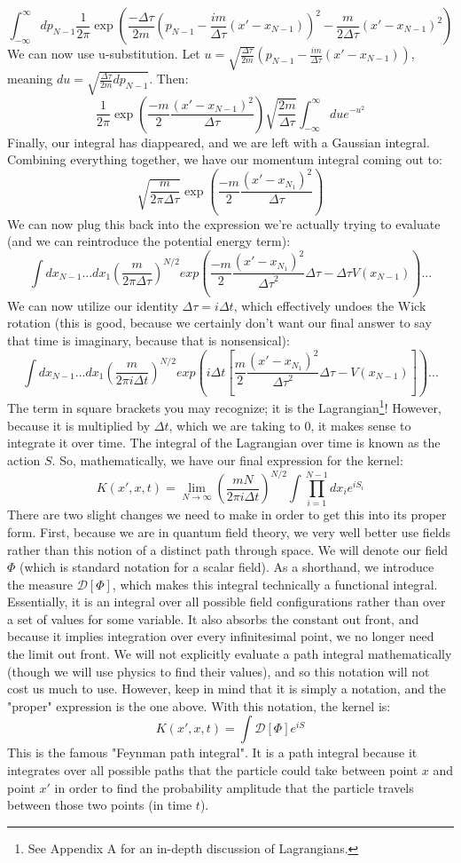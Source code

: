 \documentclass{report}
\begin{document}
\[
\int_{-\infty}^{\infty} dp_{N-1} \frac{1}{2\pi}
\exp{(\frac{-\Delta \tau}{2m}
(p_{N-1} - \frac{im}{\Delta \tau} (x' - x_{N-1}))^2 -
\frac{m}{2\Delta\tau}(x' - x_{N-1})^2)}
\]
We can now use u-substitution. Let $u = \sqrt{\frac{\Delta\tau}{2m}}(p_{N-1} - \frac{im}{\Delta\tau}(x' - x_{N-1}))$, meaning $du = \sqrt{\frac{\Delta\tau}{2m}dp_{N-1}}$. Then:
\[
\frac{1}{2\pi} \exp{(\frac{-m}{2}\frac{(x' - x_{N-1})^2}{\Delta\tau})} \sqrt{\frac{2m}{\Delta\tau}} \int_{-\infty}^{\infty} du e^{-u^2}
\]
Finally, our integral has diappeared, and we are left with a Gaussian integral. Combining everything together, we have our momentum integral coming out to:
\[
\sqrt{\frac{m}{2\pi\Delta\tau}} \exp{(\frac{-m}{2}\frac{(x' - x_{N_1})^2}{\Delta\tau})}
\]
We can now plug this back into the expression we're actually trying to evaluate (and we can reintroduce the potential energy term):
\[
\int dx_{N-1}... dx_1 (\frac{m}{2\pi\Delta\tau})^{N/2} exp{(\frac{-m}{2} 
\frac{(x' - x_{N_1})^2}{{\Delta\tau}^2}\Delta\tau -
\Delta\tau V(x_{N-1}))}...
\]
We can now utilize our identity $\Delta\tau = i\Delta t$, which effectively undoes the Wick rotation (this is good, because we certainly don't want our final answer to say that time is imaginary, because that is nonsensical):
\[
\int dx_{N-1}... dx_1 (\frac{m}{2\pi i \Delta t})^{N/2} exp{(i \Delta t [
\frac{m}{2} \frac{(x' - x_{N_1})^2}{{\Delta\tau}^2}\Delta\tau -
V(x_{N-1})])}...
\]
The term in square brackets you may recognize; it is the Lagrangian\footnote{See Appendix A for an in-depth discussion of Lagrangians.}! However, because it is multiplied by $\Delta t$, which we are taking to 0, it makes sense to integrate it over time. The integral of the Lagrangian over time is known as the action $S$. So, mathematically, we have our final expression for the kernel:
\[
K(x', x, t) = \lim_{N \to \infty} (\frac{mN}{2\pi i \Delta t})^{N/2} \int \prod_{i = 1}^{N-1} dx_i e^{iS_i}
\]
There are two slight changes we need to make in order to get this into its proper form. First, because we are in quantum field theory, we very well better use fields rather than this notion of a distinct path through space. We will denote our field $\Phi$ (which is standard notation for a scalar field). As a shorthand, we introduce the measure $\mathcal{D}[\Phi]$, which makes this integral technically a functional integral. Essentially, it is an integral over all possible field configurations rather than over a set of values for some variable. It also absorbs the constant out front, and because it implies integration over every infinitesimal point, we no longer need the limit out front. We will not explicitly evaluate a path integral mathematically (though we will use physics to find their values), and so this notation will not cost us much to use. However, keep in mind that it is simply a notation, and the "proper" expression is the one above. With this notation, the kernel is:
\[
K(x', x, t) = \int \mathcal{D}[\Phi] e^{iS}
\]
This is the famous "Feynman path integral". It is a path integral because it integrates over all possible paths that the particle could take between point $x$ and point $x'$ in order to find the probability amplitude that the particle travels between those two points (in time $t$).
\end{document}
